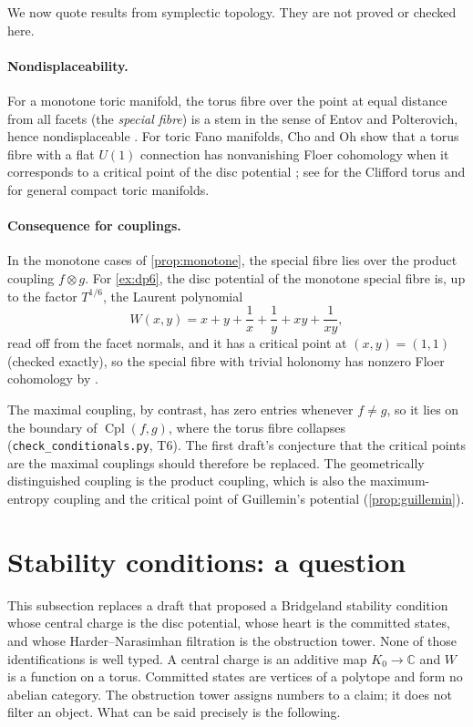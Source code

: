 \documentclass[11pt]{article}
\theoremstyle{definition}
\theoremstyle{remark}
\newcommand{\Cpl}{\operatorname{Cpl}}
\begin{document}
We now quote results from symplectic topology. They are not proved or checked here.

\paragraph{Nondisplaceability.} For a monotone toric manifold, the torus fibre over the point at equal
distance from all facets (the \emph{special fibre}) is a stem in the sense of Entov and Polterovich,
hence nondisplaceable \cite{EntovPolterovich2006}. For toric Fano manifolds, Cho and Oh show that a
torus fibre with a flat $U(1)$ connection has nonvanishing Floer cohomology when it corresponds to a
critical point of the disc potential \cite{ChoOh2006}; see \cite{Cho2004} for the Clifford torus and
\cite{FOOO2010} for general compact toric manifolds.

\paragraph{Consequence for couplings.} In the monotone cases of \cref{prop:monotone}, the special fibre
lies over the product coupling $f\otimes g$. For \cref{ex:dp6}, the disc potential of the monotone
special fibre is, up to the factor $T^{1/6}$, the Laurent polynomial
\[
W(x,y)=x+y+\frac1x+\frac1y+xy+\frac1{xy},
\]
read off from the facet normals, and it has a critical point at $(x,y)=(1,1)$ (checked exactly), so the
special fibre with trivial holonomy has nonzero Floer cohomology by \cite{ChoOh2006}.

The maximal coupling, by contrast, has zero entries whenever $f\ne g$, so it lies on the boundary of
$\Cpl(f,g)$, where the torus fibre collapses (\texttt{check\_conditionals.py}, T6). The first draft's
conjecture that the critical points are the maximal couplings should therefore be replaced. The
geometrically distinguished coupling is the product coupling, which is also the maximum-entropy
coupling and the critical point of Guillemin's potential (\cref{prop:guillemin}).

\section{Stability conditions: a question}\label{sec:stability}

This subsection replaces a draft that proposed a Bridgeland stability condition whose central charge
is the disc potential, whose heart is the committed states, and whose Harder--Narasimhan filtration
is the obstruction tower. None of those identifications is well typed. A central charge is an additive
map $K_0\to\mathbb{C}$ and $W$ is a function on a torus. Committed states are vertices of a polytope
and form no abelian category. The obstruction tower assigns numbers to a claim; it does not
filter an object. What can be said precisely is the following.
\end{document}
